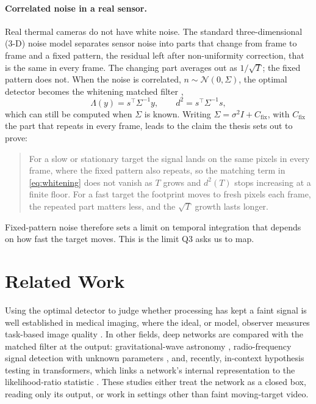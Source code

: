 \documentclass[11pt]{article}
\begin{document}
\paragraph{Correlated noise in a real sensor.} Real thermal cameras do not have
white noise. The standard three-dimensional (3-D) noise model \cite{dagostino}
separates sensor noise into parts that change from frame to frame and a fixed
pattern, the residual left after non-uniformity correction, that is the same in
every frame. The changing part averages out as $1/\sqrt{T}$; the fixed pattern
does not. When the noise is correlated, $n\sim\mathcal{N}(0,\Sigma)$, the optimal
detector becomes the whitening matched filter \cite{kay},
\begin{equation}
\Lambda(y) = s^\top \Sigma^{-1} y,
\qquad
d^2 = s^\top \Sigma^{-1} s,
\label{eq:whitening}
\end{equation}
which can still be computed when $\Sigma$ is known. Writing
$\Sigma = \sigma^2 I + C_{\mathrm{fix}}$, with $C_{\mathrm{fix}}$ the part that
repeats in every frame, leads to the claim the thesis sets out to prove:

\begin{quote}
For a slow or stationary target the signal lands on the same pixels in every
frame, where the fixed pattern also repeats, so the matching term in
\eqref{eq:whitening} does not vanish as $T$ grows and $d^2(T)$ stops increasing
at a finite floor. For a fast target the footprint moves to fresh pixels each
frame, the repeated part matters less, and the $\sqrt{T}$ growth lasts longer.
\end{quote}

\noindent Fixed-pattern noise therefore sets a limit on temporal integration
that depends on how fast the target moves. This is the limit Q3 asks us to map.

\section{Related Work}

Using the optimal detector to judge whether processing has kept a faint signal is
well established in medical imaging, where the ideal, or model, observer measures
task-based image quality \cite{barrett}. In other fields, deep networks are
compared with the matched filter at the output: gravitational-wave astronomy
\cite{gabbard}, radio-frequency signal detection with unknown parameters
\cite{anders}, and, recently, in-context hypothesis testing in transformers,
which links a network's internal representation to the likelihood-ratio statistic
\cite{chaudhry}. These studies either treat the network as a closed box, reading
only its output, or work in settings other than faint moving-target video.
\end{document}
